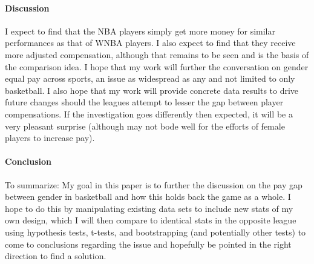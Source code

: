 \documentclass[12pt]{article}
\begin{document}
\paragraph{Discussion}
I expect to find that the NBA players simply get more money for similar performances as that of WNBA players. I also expect to find that they receive more adjusted compensation, although that remains to be seen and is the basis of the comparison idea. I hope that my work will further the conversation on gender equal pay across sports, an issue as widespread as any and not limited to only basketball. I also hope that my work will provide concrete data results to drive future changes should the leagues attempt to lesser the gap between player compensations. If the investigation goes differently then expected, it will be a very pleasant surprise (although may not bode well for the efforts of female players to increase pay).

\paragraph{Conclusion}
To summarize: My goal in this paper is to further the discussion on the pay gap between gender in basketball and how this holds back the game as a whole. I hope to do this by manipulating existing data sets to include new stats of my own design, which I will then compare to identical stats in the opposite league using hypothesis tests, t-tests, and bootstrapping (and potentially other tests) to come to conclusions regarding the issue and hopefully be pointed in the right direction to find a solution.




\end{document}
